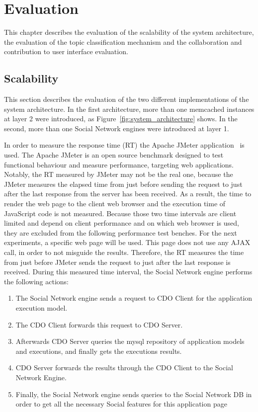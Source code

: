\chapter{Evaluation}
\label{chapt:evaluation}
This chapter describes the evaluation of the scalability of the system architecture, the evaluation of the topic classification mechanism and the collaboration and contribution to user interface evaluation.  

\section{Scalability}
\label{sec:eval_scalability}
This section describes the evaluation of the two different implementations of the system architecture. In the first architecture, more than one memcached instances at layer 2 were introduced, as Figure~\ref{fig:system_architecture} shows. In the second, more than one Social Network engines were introduced at layer 1.

In order to measure the response time (RT) the Apache JMeter application~\cite{jmeter_url} is used. The Apache JMeter is an open source benchmark designed to test functional behaviour and  measure performance, targeting web applications. Notably, the RT measured by JMeter may not be the real one, because the JMeter measures the elapsed time from just before sending the request to just after the last response from the server has been received. As a result, the time to render the web page to the client web browser and the execution time of JavaScript code is not measured. Because those two time intervals are client limited and depend on client performance and on which web browser is used, they are excluded from the following performance test benches. For the next experiments, a specific web page will be used. This page does not use any AJAX call, in order to not misguide the results. Therefore, the RT measures the time from just before JMeter sends the request to just after the last response is received. During this measured time interval, the Social Network engine performs the following actions:
\begin{enumerate}[I]
\item The Social Network engine sends a request to CDO Client for the application execution model.
\item The CDO Client forwards this request to CDO Server.
\item Afterwards CDO Server queries the mysql repository of application models and executions, and finally gets the executions results.
\item CDO Server forwards the results through the CDO Client to the Social Network Engine.
\item Finally, the Social Network engine sends queries to the Social Network DB in order to get all the necessary Social features for this application page
\end{enumerate}

